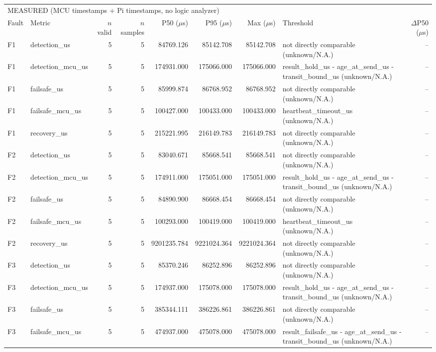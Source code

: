 \begin{tabular}{llrrrrrlr}
\multicolumn{9}{l}{MEASURED (MCU timestamps + Pi timestamps, no logic analyzer)} \\
Fault & Metric & $n$ valid & $n$ samples & P50 ($\mu$s) & P95 ($\mu$s) & Max ($\mu$s) & Threshold & $\Delta$P50 ($\mu$s) \\
\hline
F1 & detection\_us & 5 & 5 & 84769.126 & 85142.708 & 85142.708 & not directly comparable (unknown/N.A.) & -- \\
F1 & detection\_mcu\_us & 5 & 5 & 174931.000 & 175066.000 & 175066.000 & result\_hold\_us - age\_at\_send\_us - transit\_bound\_us (unknown/N.A.) & -- \\
F1 & failsafe\_us & 5 & 5 & 85999.874 & 86768.952 & 86768.952 & not directly comparable (unknown/N.A.) & -- \\
F1 & failsafe\_mcu\_us & 5 & 5 & 100427.000 & 100433.000 & 100433.000 & heartbeat\_timeout\_us (unknown/N.A.) & -- \\
F1 & recovery\_us & 5 & 5 & 215221.995 & 216149.783 & 216149.783 & not directly comparable (unknown/N.A.) & -- \\
F2 & detection\_us & 5 & 5 & 83040.671 & 85668.541 & 85668.541 & not directly comparable (unknown/N.A.) & -- \\
F2 & detection\_mcu\_us & 5 & 5 & 174911.000 & 175051.000 & 175051.000 & result\_hold\_us - age\_at\_send\_us - transit\_bound\_us (unknown/N.A.) & -- \\
F2 & failsafe\_us & 5 & 5 & 84890.900 & 86668.454 & 86668.454 & not directly comparable (unknown/N.A.) & -- \\
F2 & failsafe\_mcu\_us & 5 & 5 & 100293.000 & 100419.000 & 100419.000 & heartbeat\_timeout\_us (unknown/N.A.) & -- \\
F2 & recovery\_us & 5 & 5 & 9201235.784 & 9221024.364 & 9221024.364 & not directly comparable (unknown/N.A.) & -- \\
F3 & detection\_us & 5 & 5 & 85370.246 & 86252.896 & 86252.896 & not directly comparable (unknown/N.A.) & -- \\
F3 & detection\_mcu\_us & 5 & 5 & 174937.000 & 175078.000 & 175078.000 & result\_hold\_us - age\_at\_send\_us - transit\_bound\_us (unknown/N.A.) & -- \\
F3 & failsafe\_us & 5 & 5 & 385344.111 & 386226.861 & 386226.861 & not directly comparable (unknown/N.A.) & -- \\
F3 & failsafe\_mcu\_us & 5 & 5 & 474937.000 & 475078.000 & 475078.000 & result\_failsafe\_us - age\_at\_send\_us - transit\_bound\_us (unknown/N.A.) & -- \\

\end{tabular}
